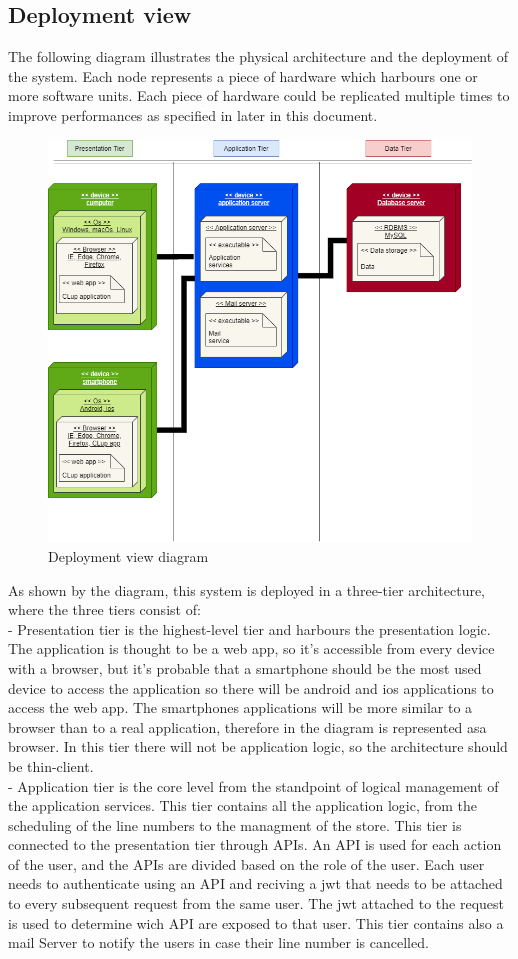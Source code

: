 \subsection{Deployment view}
The following diagram illustrates the physical architecture and the
deployment of the system.
Each node represents a piece of hardware which harbours one or more software units.
Each piece of hardware could be replicated multiple times to improve performances as  specified in later in this document.

\begin{figure}[H]
    \centering
    \hspace*{-3.5cm}
    \includegraphics[height=0.7\textwidth]{Images/TierDiagram.png}
    \caption{Deployment view diagram}
\end{figure}

As shown by the diagram, this system is deployed in a three-tier
architecture, where the three tiers consist of: \\
- Presentation tier is the highest-level tier and harbours the presentation logic.
The application is thought to be a web app, so it's accessible from every device with a browser, but it's probable that
a smartphone should be the most used device to access the application so there will be android and ios applications to access
the web app.
The smartphones applications will be more similar to a browser than to a real application, therefore in the diagram is represented asa browser.
In this tier there will not be application logic, so the architecture should be thin-client.\\
- Application tier is the core level from the standpoint of logical management of the application services.
This tier contains all the application logic, from the scheduling of the line numbers to the managment of the store.
This tier is connected to the presentation tier through APIs.
An API is used for each action of the user, and the APIs are divided based on the role of the user.
Each user needs to authenticate using an API and reciving a jwt that needs to be attached to every subsequent request from the same user.
The jwt attached to the request is used to determine wich API are exposed to that user.
This tier contains also a mail Server to notify the users in case their line number is cancelled. \\

